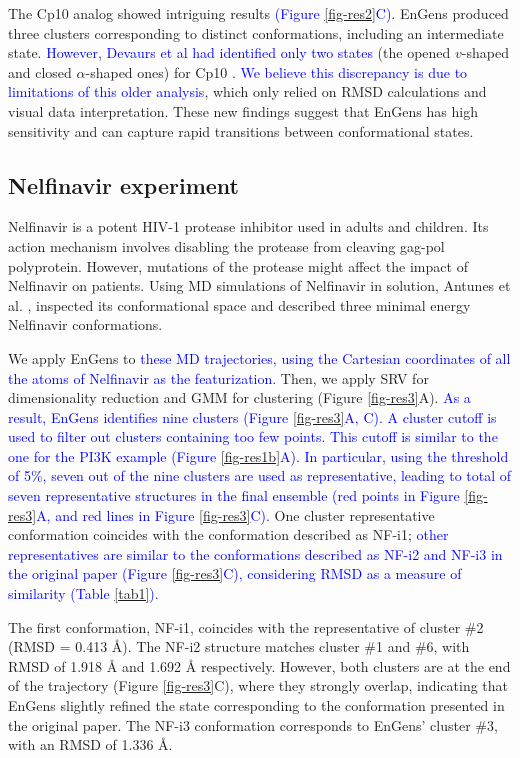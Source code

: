 \documentclass[unnumsec,webpdf,contemporary,large,numsquare]{oup-authoring-template}%
\theoremstyle{thmstyleone}%
\theoremstyle{thmstyletwo}%
\theoremstyle{thmstylethree}%
\begin{document}
The Cp10 analog showed intriguing results \textcolor{blue}{(Figure \ref{fig-res2}C)}. EnGens produced three clusters corresponding to distinct conformations, including an intermediate state. \textcolor{blue}{However, Devaurs et al had identified only two states} (the opened $v$-shaped  and closed $\alpha$-shaped ones) for Cp10 \citep{devaurs_computational_2020}. \textcolor{blue}{We believe this discrepancy is due to limitations of this older analysis}, which only relied on RMSD calculations and visual data interpretation. These new findings suggest that EnGens has high sensitivity and can capture rapid transitions between conformational states.

\subsection{Nelfinavir experiment}
 
Nelfinavir is a potent HIV-1 protease inhibitor used in adults and children. Its action mechanism involves disabling the protease from cleaving gag-pol polyprotein. However, mutations of the protease might affect the impact of Nelfinavir on patients. Using MD simulations of Nelfinavir in solution, Antunes et al. \citep{antunes_new_2014}, inspected its conformational space and described three minimal energy Nelfinavir conformations.

 We apply EnGens to \textcolor{blue}{these MD trajectories, using the Cartesian coordinates of all the atoms of Nelfinavir as the featurization.} Then, we apply SRV for dimensionality reduction and GMM for clustering (Figure \ref{fig-res3}A). \textcolor{blue}{As a result, EnGens identifies nine clusters (Figure \ref{fig-res3}A, C). A cluster cutoff is used to filter out clusters containing too few points. This cutoff is similar to the one for the PI3K example (Figure \ref{fig-res1b}A). In particular, using the threshold of 5\%, seven out of the nine clusters are used as representative, leading to total of seven representative structures in the final ensemble (red points in Figure \ref{fig-res3}A, and red lines in Figure \ref{fig-res3}C).}  One cluster representative conformation coincides with the conformation described as NF-i1; \textcolor{blue}{other representatives are similar to the conformations described as NF-i2 and NF-i3 in the original paper (Figure \ref{fig-res3}C), considering RMSD as a measure of similarity (Table \ref{tab1}).}
 
The first conformation, NF-i1, coincides with the representative of cluster \#2 (RMSD = 0.413 Å). The NF-i2 structure matches cluster \#1 and \#6, with RMSD of 1.918 Å and 1.692 Å respectively. However, both clusters are at the end of the trajectory (Figure \ref{fig-res3}C), where they strongly overlap, indicating that EnGens slightly refined the state corresponding to the conformation presented in the original paper. The NF-i3 conformation corresponds to EnGens' cluster \#3, with an RMSD of 1.336 Å.
\end{document}
